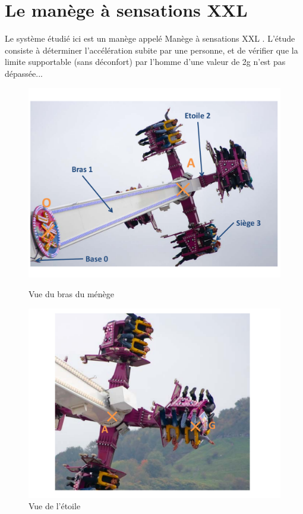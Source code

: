 

\section{Le manège à sensations XXL}

Le système étudié ici est un manège appelé \og Manège à sensations XXL \fg. L'étude consiste à déterminer l'accélération subite par une personne, et de vérifier que la limite supportable (sans déconfort) par l'homme d'une valeur de 2g n'est pas dépassée...

\begin{figure}[htbp]
\begin{minipage}[c]{.48\linewidth}
\begin{center}
\includegraphics[width=\linewidth]{img/Manege1.pdf}
\caption{Vue du bras du ménège}
\label{fig:image1}
\end{center}
\end{minipage}
\hfill
\begin{minipage}[c]{.48\linewidth}
\begin{center}
\includegraphics[width=\linewidth]{img/Manege2.pdf}
\caption{Vue de l'étoile}
\label{fig:image2}
\end{center}
\end{minipage}
\end{figure}

